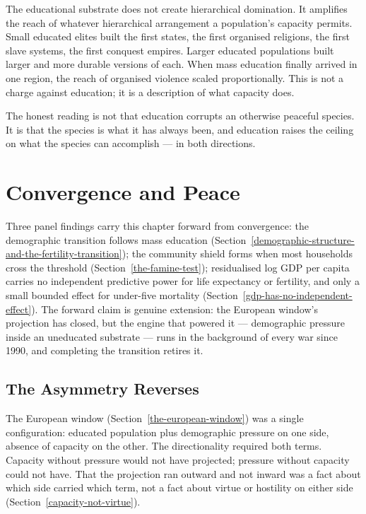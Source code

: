 \documentclass[12pt,letterpaper]{article}
\begin{document}
The educational substrate does not create hierarchical domination. It
amplifies the reach of whatever hierarchical arrangement a
population's capacity permits. Small educated elites built the first
states, the first organised religions, the first slave systems, the
first conquest empires. Larger educated populations built larger and
more durable versions of each. When mass education finally arrived in
one region, the reach of organised violence scaled proportionally.
This is not a charge against education; it is a description of what
capacity does.

The honest reading is not that education corrupts an otherwise
peaceful species. It is that the species is what it has always been,
and education raises the ceiling on what the species can accomplish
--- in both directions.

\section{Convergence and Peace}\label{convergence-and-peace}

Three panel findings carry this chapter forward from convergence: the
demographic transition follows mass education
(Section~\ref{demographic-structure-and-the-fertility-transition}); the
community shield forms when most households cross the threshold
(Section~\ref{the-famine-test}); residualised log GDP per capita
carries no independent predictive power for life expectancy or
fertility, and only a small bounded effect for under-five mortality
(Section~\ref{gdp-has-no-independent-effect}). The forward claim is
genuine extension: the European window's projection has closed, but
the engine that powered it --- demographic pressure inside an
uneducated substrate --- runs in the background of every war since
1990, and completing the transition retires it.

\subsection{The Asymmetry Reverses}\label{the-asymmetry-reverses}

The European window (Section~\ref{the-european-window}) was a single
configuration: educated population plus demographic pressure on one
side, absence of capacity on the other. The directionality required
both terms. Capacity without pressure would not have projected;
pressure without capacity could not have. That the projection ran
outward and not inward was a fact about which side carried which
term, not a fact about virtue or hostility on either side
(Section~\ref{capacity-not-virtue}).
\end{document}
